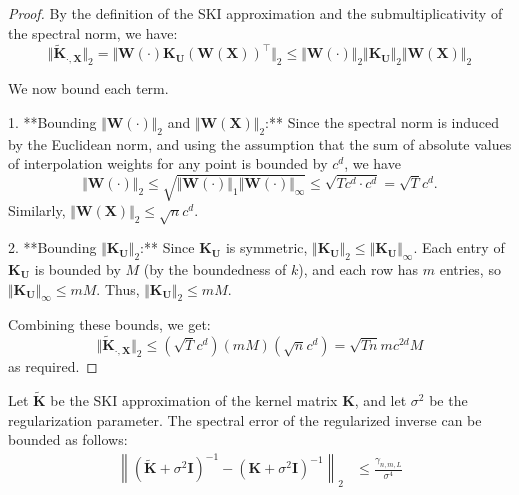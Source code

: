 \begin{proof}
    By the definition of the SKI approximation and the submultiplicativity of the spectral norm, we have:
    $$
    \Vert \tilde{\textbf{K}}_{\cdot,\textbf{X}}\Vert_2 = \Vert \textbf{W}(\cdot)\textbf{K}_{\textbf{U}}(\textbf{W}(\textbf{X}))^\top\Vert_2 \leq \Vert \textbf{W}(\cdot)\Vert_2 \Vert\textbf{K}_{\textbf{U}}\Vert_2 \Vert\textbf{W}(\textbf{X})\Vert_2
    $$

    We now bound each term.

    1.  **Bounding $\Vert \textbf{W}(\cdot)\Vert_2$ and $\Vert \textbf{W}(\textbf{X})\Vert_2$:**
        Since the spectral norm is induced by the Euclidean norm, and using the assumption that the sum of absolute values of interpolation weights for any point is bounded by $c^d$, we have
        $$\Vert \textbf{W}(\cdot)\Vert_2 \leq \sqrt{\Vert \textbf{W}(\cdot)\Vert_1 \Vert \textbf{W}(\cdot)\Vert_\infty} \leq \sqrt{T c^d \cdot c^d} = \sqrt{T} c^d.$$
        Similarly, $\Vert\textbf{W}(\textbf{X})\Vert_2 \leq \sqrt{n}c^d$.

    2.  **Bounding $\Vert\textbf{K}_{\textbf{U}}\Vert_2$:**
        Since $\textbf{K}_{\textbf{U}}$ is symmetric, $\Vert \textbf{K}_{\textbf{U}} \Vert_2 \leq \Vert \textbf{K}_{\textbf{U}} \Vert_\infty$. Each entry of $\textbf{K}_{\textbf{U}}$ is bounded by $M$ (by the boundedness of $k$), and each row has $m$ entries, so $\Vert \textbf{K}_{\textbf{U}} \Vert_\infty \leq mM$. Thus, $\Vert\textbf{K}_{\textbf{U}}\Vert_2 \leq mM$.

    Combining these bounds, we get:
    $$
    \Vert \tilde{\textbf{K}}_{\cdot,\textbf{X}}\Vert_2 \leq (\sqrt{T} c^d) (mM) (\sqrt{n} c^d) = \sqrt{Tn} m c^{2d} M
    $$
    as required.
\end{proof}


\begin{lemma}\label{lemma:action-inverse-error}
    Let \(\mathbf{\tilde{K}}\) be the SKI approximation of the kernel matrix \(\mathbf{K}\), and let \(\sigma^2\) be the regularization parameter. The spectral error of the regularized inverse can be bounded as follows:
\begin{align*}
\left\|\left(\mathbf{\tilde{K}} + \sigma^2 \mathbf{I}\right)^{-1} - \left(\mathbf{K} + \sigma^2 \mathbf{I}\right)^{-1} \right\|_2 &\leq \frac{\gamma_{n, m, L}}{\sigma^4} 
\end{align*}
\end{lemma} 

